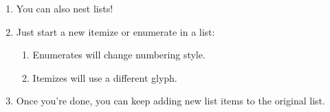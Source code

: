 \begin{enumerate}
  \item You can also nest lists!
  \item Just start a new itemize or enumerate in a list:
    \begin{enumerate}
      \item Enumerates will change numbering style.
      \item Itemizes will use a different glyph.
    \end{enumerate}
  \item Once you're done, you can keep adding new
    list items to the original list.
\end{enumerate}
